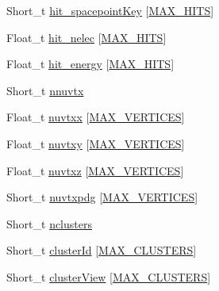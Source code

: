 \begin{DoxyCompactItemize}
\item 
Short\-\_\-t \hyperlink{classanatree_a83b06a33d20b0fe07916050ad1c55426}{hit\-\_\-spacepoint\-Key} \mbox{[}\hyperlink{anatree__core__v09410002__orig_8h_a817cc372e529c6dcaa3116b2782203df}{M\-A\-X\-\_\-\-H\-I\-T\-S}\mbox{]}
\item 
Float\-\_\-t \hyperlink{classanatree_a422a1eb463bc395d117a4e2e6dc2b4ba}{hit\-\_\-nelec} \mbox{[}\hyperlink{anatree__core__v09410002__orig_8h_a817cc372e529c6dcaa3116b2782203df}{M\-A\-X\-\_\-\-H\-I\-T\-S}\mbox{]}
\item 
Float\-\_\-t \hyperlink{classanatree_acde23195130ed65218a46955bd79a8f3}{hit\-\_\-energy} \mbox{[}\hyperlink{anatree__core__v09410002__orig_8h_a817cc372e529c6dcaa3116b2782203df}{M\-A\-X\-\_\-\-H\-I\-T\-S}\mbox{]}
\item 
Short\-\_\-t \hyperlink{classanatree_a72c05e2c01f85575b911ccd47060bfbd}{nnuvtx}
\item 
Float\-\_\-t \hyperlink{classanatree_ae396ae06e085b0021c54968668519b1b}{nuvtxx} \mbox{[}\hyperlink{anatree__core__v09410002__orig_8h_a6ac49acb0970e608315ca232a9fc8828}{M\-A\-X\-\_\-\-V\-E\-R\-T\-I\-C\-E\-S}\mbox{]}
\item 
Float\-\_\-t \hyperlink{classanatree_af7bc58e94bad55538d5d72697de485d6}{nuvtxy} \mbox{[}\hyperlink{anatree__core__v09410002__orig_8h_a6ac49acb0970e608315ca232a9fc8828}{M\-A\-X\-\_\-\-V\-E\-R\-T\-I\-C\-E\-S}\mbox{]}
\item 
Float\-\_\-t \hyperlink{classanatree_a8b24134ada26040c2c70bc0aa7f8732a}{nuvtxz} \mbox{[}\hyperlink{anatree__core__v09410002__orig_8h_a6ac49acb0970e608315ca232a9fc8828}{M\-A\-X\-\_\-\-V\-E\-R\-T\-I\-C\-E\-S}\mbox{]}
\item 
Short\-\_\-t \hyperlink{classanatree_a9202f57b945c52d6579fc9ec9938829a}{nuvtxpdg} \mbox{[}\hyperlink{anatree__core__v09410002__orig_8h_a6ac49acb0970e608315ca232a9fc8828}{M\-A\-X\-\_\-\-V\-E\-R\-T\-I\-C\-E\-S}\mbox{]}
\item 
Short\-\_\-t \hyperlink{classanatree_a0b190f9cf843aa1aa7d2c0cccf1addeb}{nclusters}
\item 
Short\-\_\-t \hyperlink{classanatree_a473ab2c02b36fd4cae6aed6e9da33f32}{cluster\-Id} \mbox{[}\hyperlink{anatree__core__v09410002__orig_8h_a7250daa0fff832693cecd6907e64f6ec}{M\-A\-X\-\_\-\-C\-L\-U\-S\-T\-E\-R\-S}\mbox{]}
\item 
Short\-\_\-t \hyperlink{classanatree_a48678b60b63909c9e0a1d33088c7293f}{cluster\-View} \mbox{[}\hyperlink{anatree__core__v09410002__orig_8h_a7250daa0fff832693cecd6907e64f6ec}{M\-A\-X\-\_\-\-C\-L\-U\-S\-T\-E\-R\-S}\mbox{]}

\end{DoxyCompactItemize}
